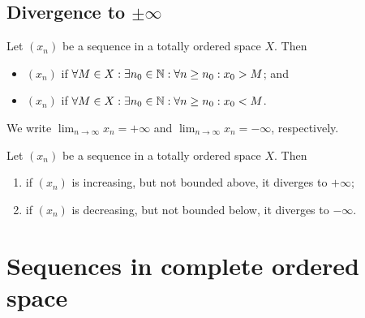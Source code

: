 \subsection{Divergence to $\pm\infty$}
\begin{definition}
Let $(x_n)$ be a sequence in a totally ordered space $X$. Then
\begin{itemize}
\item $(x_n)$  if $\forall M\in X: \exists n_0\in\mathbb{N}: \forall n\geq n_0: x_0 > M$; and
\item $(x_n)$  if $\forall M\in X: \exists n_0\in\mathbb{N}: \forall n\geq n_0: x_0 < M$.
\end{itemize}
We write $\lim_{n\to\infty}x_n = +\infty$ and $\lim_{n\to\infty}x_n = -\infty$, respectively.
\end{definition}

\begin{lemma}
Let $(x_n)$ be a sequence in a totally ordered space $X$. Then
\begin{enumerate}
\item if $(x_n)$ is increasing, but not bounded above, it diverges to $+\infty$;
\item if $(x_n)$ is decreasing, but not bounded below, it diverges to $-\infty$.
\end{enumerate}
\end{lemma}

\section{Sequences in complete ordered space}
